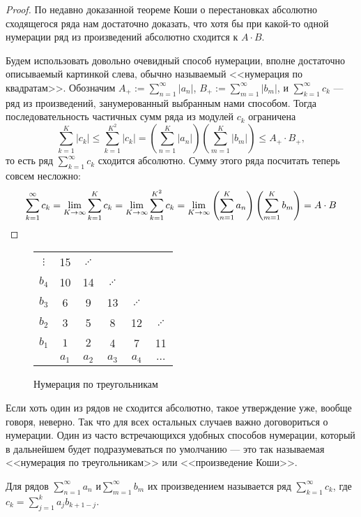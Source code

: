 	\begin{proof} По недавно доказанной теореме Коши о перестановках абсолютно сходящегося ряда нам достаточно доказать, что хотя бы при какой-то одной нумерации ряд из произведений абсолютно сходится к $A\cdot B$.	
		
		Будем использовать довольно очевидный способ нумерации, вполне достаточно описываемый картинкой слева, обычно называемый <<нумерация по квадратам>>. 	Обозначим $A_+ := \sum\limits_{n=1}^{\infty}|a_n|$,  $B_+ := \sum\limits_{m=1}^{\infty}|b_m|$, и $\sum\limits_{k=1}^{\infty}c_k$ --- ряд из произведений, занумерованный выбранным нами способом. Тогда последовательность частичных сумм ряда из модулей $c_k$ ограничена \\
		\[
		\sum\limits_{k=1}^{K}|c_k| \leq \sum\limits_{k=1}^{K^2}|c_k| = \left(\sum\limits_{n=1}^{K}|a_n|\right)\left(\sum\limits_{m=1}^{K}|b_m|\right) \leq A_+\cdot B_+,
		\] 
		то есть ряд $\sum\limits_{k=1}^{\infty}c_k$ сходится абсолютно. 
		Сумму этого ряда посчитать теперь совсем несложно:
		\[\sum\limits_{k=1}^{\infty}c_k = \lim\limits_{K\rightarrow \infty} \sum\limits_{k=1}^{K}c_k = \lim\limits_{K\rightarrow \infty} \sum\limits_{k=1}^{K^2}c_k = \lim\limits_{K\rightarrow \infty} \left(\sum\limits_{n=1}^{K}a_n\right)\left(\sum\limits_{m=1}^{K}b_m\right)=A\cdot B
		\]
		\end{proof}
		
	\begin{wrapfigure}{r}{0.3\linewidth}
		\begin{tabular}[t]{c|ccccc}
			$\vdots$ &15& $\iddots$& & & \\
			$b_4$ & 10 & 14&$\iddots$ &&  \\
			$b_3$ & 6 & 9 & 13&$\iddots$ &   \\
			$b_2$ & 3 & 5& 8 & 12&$\iddots$ \\
			$b_1$ & $1$ & $2$ &4&7&11\\
			\hline
			& $a_1$ & $a_2$ & $a_3$ & $a_4$ &$\dots$ \\
		\end{tabular}
		\caption{Нумерация по треугольникам}
		\vspace{-60pt}
	\end{wrapfigure}
	Если хоть один из рядов не сходится абсолютно, такое утверждение уже, вообще говоря, неверно. Так что для всех остальных случаев важно договориться о нумерации. Один из часто встречающихся удобных способов нумерации, который в дальнейшем будет подразумеваться по умолчанию --- это так называемая <<нумерация по треугольникам>> или <<произведение Коши>>.
	\begin{Def}
		Для рядов $\sum\limits_{n=1}^{\infty}a_n$ и$ \sum\limits_{m=1}^{\infty}b_m$ их произведением называется ряд  $\sum\limits_{k=1}^{\infty}c_k$, где $c_k =\sum\limits_{j=1}^{k}a_jb_{k+1-j}$.
	\end{Def}
	
